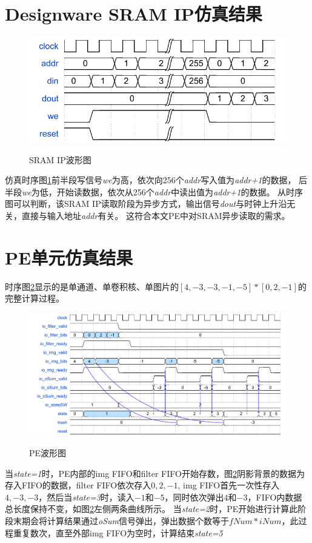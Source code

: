 \section{Designware SRAM IP仿真结果}
\begin{figure}[h]
    \centering
    \includegraphics{../pdf/sram_w.pdf}\\
    \caption{SRAM IP波形图}
    \label{sram_w}
\end{figure}
仿真时序图\ref{sram_w}前半段写信号\emph{we}为高，依次向256个\emph{addr}写入值为\emph{addr+1}的数据，
后半段\emph{we}为低，开始读数据，依次从256个\emph{addr}中读出值为\emph{addr+1}的数据。
从时序图可以判断，该SRAM IP读取阶段为异步方式，输出信号\emph{dout}与时钟上升沿无关，直接与输入地址\emph{addr}有关。
这符合本文PE中对SRAM异步读取的需求。

\section{PE单元仿真结果}
时序图\ref{pe_w}显示的是单通道、单卷积核、单图片的$[4,-3,-3,-1,-5] * [0,2,-1]$的完整计算过程。
\begin{figure}[h]
    \centering
    \includegraphics[scale=0.7]{../pdf/pe_w.pdf}\\
    \caption{PE波形图}
    \label{pe_w}
\end{figure}
当\emph{state=1}时，PE内部的img FIFO和filter FIFO开始存数，图\ref{pe_w}阴影背景的数据为存入FIFO的数据，filter FIFO依次存入$0,2,-1$,
img FIFO首先一次性存入$4,-3,-3$，然后当\emph{state=3}时，读入$-1$和$-5$，同时依次弹出$4$和$-3$，FIFO内数据总长度保持不变，如图\ref{pe_w}左侧两条曲线所示。
当\emph{state=2}时，PE开始进行计算此阶段末期会将计算结果通过\emph{oSum}信号弹出，弹出数据个数等于$fNum*iNum$，此过程重复数次，直至外部img FIFO为空时，计算结束\emph{state=5}


